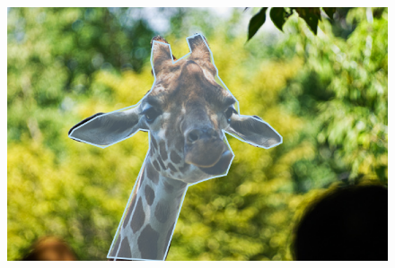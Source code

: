 \documentclass[smallextended]{svjour3}
\begin{document}
\begin{figure}
{\includegraphics[scale=0.2]{figures/coco/giraffe/coco-annotation.png}
}%


\end{figure}
\end{document}
